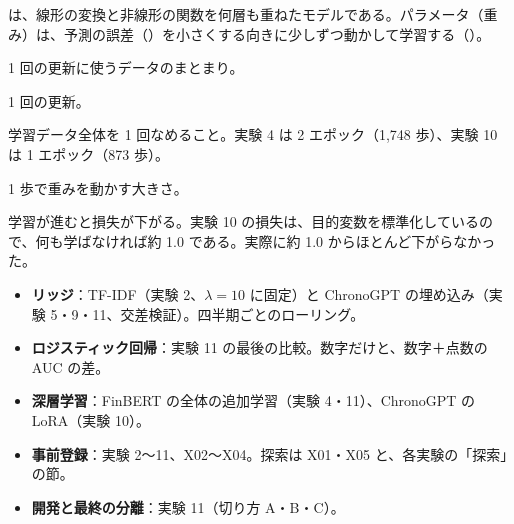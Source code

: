 は、線形の変換と非線形の関数を何層も重ねたモデルである。パラメータ（重み）は、予測の誤差（）を小さくする向きに少しずつ動かして学習する（）。

\begin{description}[leftmargin=1.5em,style=nextline]
\item[バッチ] 1 回の更新に使うデータのまとまり。
\item[歩（ステップ）] 1 回の更新。
\item[エポック] 学習データ全体を 1 回なめること。実験 4 は 2 エポック（1,748 歩）、実験 10 は 1 エポック（873 歩）。
\item[学習率] 1 歩で重みを動かす大きさ。
\item[損失の推移] 学習が進むと損失が下がる。実験 10 の損失は、目的変数を標準化しているので、何も学ばなければ約 1.0 である。実際に約 1.0 からほとんど下がらなかった。
\end{description}

\begin{projbox}
\begin{itemize}
\item \textbf{リッジ}：TF-IDF（実験 2、$\lambda=10$ に固定）と ChronoGPT の埋め込み（実験 5・9・11、交差検証）。四半期ごとのローリング。
\item \textbf{ロジスティック回帰}：実験 11 の最後の比較。数字だけと、数字＋点数の AUC の差。
\item \textbf{深層学習}：FinBERT の全体の追加学習（実験 4・11）、ChronoGPT の LoRA（実験 10）。
\item \textbf{事前登録}：実験 2〜11、X02〜X04。探索は X01・X05 と、各実験の「探索」の節。
\item \textbf{開発と最終の分離}：実験 11（切り方 A・B・C）。
\end{itemize}
\end{projbox}
